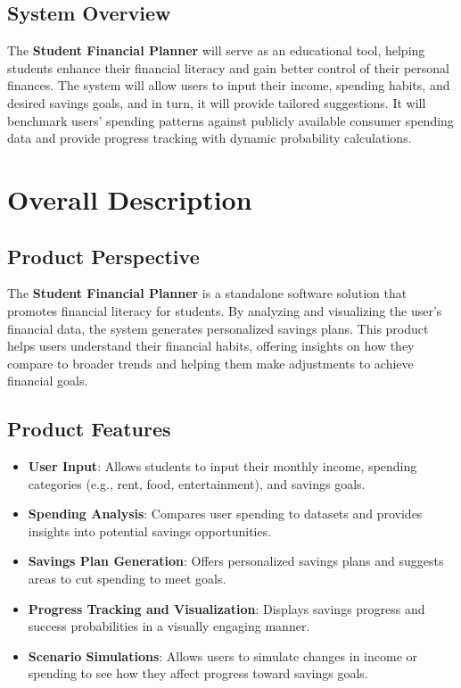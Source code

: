 \documentclass{article}
\begin{document}
\subsection{System Overview}
The \textbf{Student Financial Planner} will serve as an educational tool, helping students enhance their financial literacy and gain better control of their personal finances. The system will allow users to input their income, spending habits, and desired savings goals, and in turn, it will provide tailored suggestions. It will benchmark users' spending patterns against publicly available consumer spending data and provide progress tracking with dynamic probability calculations. 


\section{Overall Description}
\subsection{Product Perspective}
The \textbf{Student Financial Planner} is a standalone software solution that promotes financial literacy for students. By analyzing and visualizing the user's financial data, the system generates personalized savings plans. This product helps users understand their financial habits, offering insights on how they compare to broader trends and helping them make adjustments to achieve financial goals.

\subsection{Product Features}
\begin{itemize}
    \item \textbf{User Input}: Allows students to input their monthly income, spending categories (e.g., rent, food, entertainment), and savings goals.
    \item \textbf{Spending Analysis}: Compares user spending to datasets and provides insights into potential savings opportunities.
    \item \textbf{Savings Plan Generation}: Offers personalized savings plans and suggests areas to cut spending to meet goals.
    \item \textbf{Progress Tracking and Visualization}: Displays savings progress and success probabilities in a visually engaging manner.
    \item \textbf{Scenario Simulations}: Allows users to simulate changes in income or spending to see how they affect progress toward savings goals.
\end{itemize}
\end{document}
